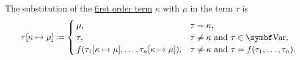 \begin{definition}
\begin{DefEnum}
     The substitution of the \hyperref[def:first_order_language/term]{first order term} \( \kappa \) with \( \mu \) in the term \( \tau \) is
    \begin{equation}\label{eq:def:first_order_substitution/term_in_term}
      \tau[\kappa \mapsto \mu] \coloneqq \begin{cases}
        \mu,                                                               &\tau = \kappa, \\
        \tau,                                                              &\tau \neq \kappa \T{and} \tau \in \Bold{Var}, \\
        f(\tau_1[\kappa \mapsto \mu], \ldots, \tau_n[\kappa \mapsto \mu]), &\tau \neq \kappa \T{and} \tau = f(\tau_1, \ldots, \tau_n).
      \end{cases}
    \end{equation}


\end{DefEnum}
\end{definition}
